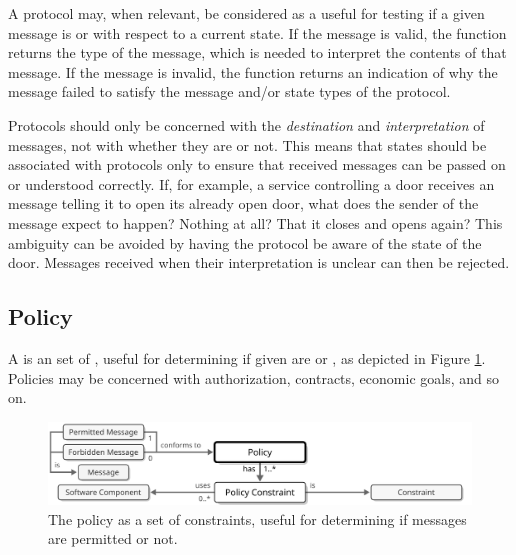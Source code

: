 A protocol may, when relevant, be considered as a  useful for testing if a given message is  or  with respect to a current state.
If the message is valid, the function returns the type of the message, which is needed to interpret the contents of that message.
If the message is invalid, the function returns an indication of why the message failed to satisfy the message and/or state types of the protocol. 

Protocols should only be concerned with the \textit{destination} and \textit{interpretation} of messages, not with whether they are  or not.
This means that states should be associated with protocols only to ensure that received messages can be passed on or understood correctly.
If, for example, a service controlling a door receives an message telling it to open its already open door, what does the sender of the message expect to happen?
Nothing at all?
That it closes and opens again?
This ambiguity can be avoided by having the protocol be aware of the state of the door.
Messages received when their interpretation is unclear can then be rejected.

\subsection{Policy}
\label{sec:concepts:policy}

A  is an  set of , useful for determining if given  are  or , as depicted in Figure \ref{fig:policy}.
Policies may be concerned with authorization, contracts, economic goals, and so on.

\vfill

\begin{figure}[ht!]
  \centering
  \includegraphics[scale=0.9]{figures/policy}
  \caption{
    The policy as a set of constraints, useful for determining if messages are permitted or not.
  }
  \label{fig:policy}
\end{figure}

